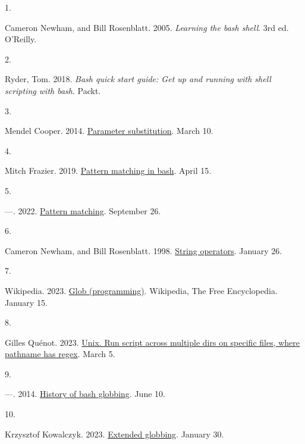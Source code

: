 \documentclass[
  a4paper,
]{article}
\newlength{\cslhangindent}
\newlength{\csllabelwidth}
\newlength{\cslentryspacingunit} %
\newenvironment{CSLReferences}[2] %
 {%
  \setlength{\parindent}{0pt}
  \ifodd #1
  \let\oldpar\par
  \def\par{\hangindent=\cslhangindent\oldpar}
  \fi
  \setlength{\parskip}{#2\cslentryspacingunit}
 }%
 {}
\newcommand{\CSLLeftMargin}[1]{\parbox[t]{\csllabelwidth}{#1}}
\newcommand{\CSLRightInline}[1]{\parbox[t]{\linewidth - \csllabelwidth}{#1}\break}
\begin{document}
\hypertarget{refs}{}
\begin{CSLReferences}{0}{0}
\leavevmode{}%
\CSLLeftMargin{1. }%
\CSLRightInline{Cameron Newham, and Bill Rosenblatt. 2005.
\emph{Learning the bash shell}. 3rd ed. O'Reilly.}

\leavevmode{}%
\CSLLeftMargin{2. }%
\CSLRightInline{Ryder, Tom. 2018. \emph{Bash quick start guide: Get up
and running with shell scripting with bash}. Packt.}

\leavevmode{}%
\CSLLeftMargin{3. }%
\CSLRightInline{Mendel Cooper. 2014.
\href{https://tldp.org/LDP/abs/html/parameter-substitution.html}{Parameter
substitution}. March 10.}

\leavevmode{}%
\CSLLeftMargin{4. }%
\CSLRightInline{Mitch Frazier. 2019.
\href{https://www.linuxjournal.com/content/pattern-matching-bash}{Pattern
matching in bash}. April 15.}

\leavevmode{}%
\CSLLeftMargin{5. }%
\CSLRightInline{---. 2022.
\href{https://www.gnu.org/software/bash/manual/html_node/Pattern-Matching.html}{Pattern
matching}. September 26.}

\leavevmode{}%
\CSLLeftMargin{6. }%
\CSLRightInline{Cameron Newham, and Bill Rosenblatt. 1998.
\href{https://www.oreilly.com/library/view/learning-the-bash/1565923472/ch04s03.html}{String
operators}. January 26.}

\leavevmode{}%
\CSLLeftMargin{7. }%
\CSLRightInline{Wikipedia. 2023.
\href{https://en.wikipedia.org/w/index.php?title=Glob_(programming)\&oldid=1133836865}{Glob
(programming)}. Wikipedia, The Free Encyclopedia. January 15.}

\leavevmode{}%
\CSLLeftMargin{8. }%
\CSLRightInline{Gilles Quénot. 2023.
\href{https://unix.stackexchange.com/a/738684/11610}{Unix. Run script
across multiple dirs on specific files, where pathname has regex}. March
5.}

\leavevmode{}%
\CSLLeftMargin{9. }%
\CSLRightInline{---. 2014.
\href{https://unix.stackexchange.com/questions/136353/history-of-bash-globbing}{History
of bash globbing}. June 10.}

\leavevmode{}%
\CSLLeftMargin{10. }%
\CSLRightInline{Krzysztof Kowalczyk. 2023.
\href{https://www.programming-books.io/essential/bash/extended-globbing-7c7bf6bd68b64f0e919716228ef9f3df}{Extended
globbing}. January 30.}


\end{CSLReferences}
\end{document}
